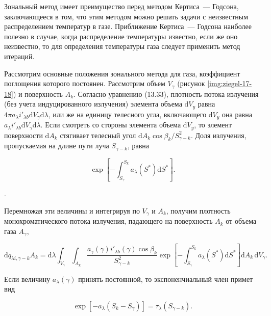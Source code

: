 Зональный метод имеет преимущество перед методом Кертиса~—
Годсона, заключающееся в том, что этим методом можно решать
задачи с неизвестным распределением температур в газе.
Приближение Кертиса~— Годсона наиболее полезно в случае, когда
распределение температуры известно, если же оно неизвестно, то для
определения температуры газа следует применить метод итераций.

Рассмотрим основные положения зонального метода для газа,
коэффициент поглощения которого постоянен. Рассмотрим объем
$V_\gamma$ (рисунок \ref{img:ziegel-17-18}) и поверхность $A_k$. Согласно уравнению (13.33),
плотность потока излучения (без учета индуцированного
излучения) элемента объема $\mathrm dV_y$ равна $4\pi a_\lambda i'_{\lambda b}\mathrm dV_\gamma\mathrm d\lambda$, или же на единицу
телесного угла, включающего $\mathrm dV_y$ она равна $a_\lambda i'_{\lambda b}\mathrm dV_\gamma\mathrm d\lambda$. Если
смотреть со стороны элемента объема $\mathrm dV_y$, то элемент поверхности
$\mathrm dA_k$ стягивает телесный угол $\mathrm dA_k\cos{\beta_k/S^2_{\gamma-k}}$. Доля излучения,
пропускаемая на длине пути луча $S_{\gamma-k}$, равна

\begin{equation}
	\exp{\left[ -\int_{S_\gamma}^{S_k} a_\lambda \left(S^*\right) \mathrm dS^* \right]}.
\end{equation}

.

\noindent Перемножая эти величины и интегрируя по $V_\gamma$ и $A_k$, получим
плотность монохроматического потока излучения, падающего
на поверхность $A_k$ от объема газа $A_\gamma$,

\begin{equation}
	\mathrm dq_{\lambda i, \gamma - k}A_k = \mathrm d\lambda \int_{V_\gamma} \int_{A_k} \frac{a_\gamma(\gamma)i'_{\lambda b}(\gamma)\cos{\beta_k}}{S^2_{\gamma-k}}
	\exp{\left[ -\int_{S_\gamma}^{S_k} a_\lambda \left(S^*\right) \mathrm dS^* \right]} \mathrm dA_k \, \mathrm dV_\gamma.
\end{equation}

\noindent Если величину $a_\lambda(\gamma)$ принять постоянной, то экспоненчиальный член примет вид

\begin{equation}
	\label{eqn:ziegel-17-94}
	\exp{\left[ -a_\lambda (S_k - S_\gamma) \right]} = \tau_\lambda (S_{\gamma - k}).
\end{equation}

